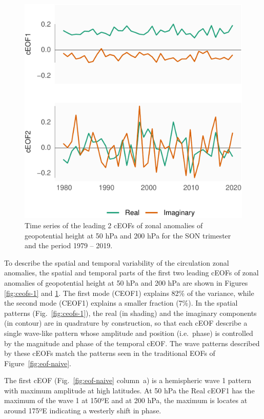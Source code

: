 \documentclass[smallextended]{svjour3}       %
\begin{document}
\begin{figure}
\centering
\includegraphics{../figures/ceofs-2-1.pdf}
\caption{\label{fig:ceofs-2}Time series of the leading 2 cEOFs of zonal anomalies of geopotential height at 50 hPa and 200 hPa for the SON trimester and the period 1979 -- 2019.}
\end{figure}

To describe the spatial and temporal variability of the circulation zonal anomalies, the spatial and temporal parts of the first two leading cEOFs of zonal anomalies of geopotential height at 50 hPa and 200 hPa are shown in Figures \ref{fig:ceofs-1} and \ref{fig:ceofs-2}. The first mode (CEOF1) explains 82\% of the variance, while the second mode (CEOF1) explains a smaller fraction (7\%). In the spatial patterns (Fig.~\ref{fig:ceofs-1}), the real (in shading) and the imaginary components (in contour) are in quadrature by construction, so that each cEOF describe a single wave-like pattern whose amplitude and position (i.e.~phase) is controlled by the magnitude and phase of the temporal cEOF. The wave patterns described by these cEOFs match the patterns seen in the traditional EOFs of Figure~\ref{fig:eof-naive}.

The first cEOF (Fig.~\ref{fig:eof-naive} column~a) is a hemispheric wave 1 pattern with maximum amplitude at high latitudes. At 50 hPa the Real cEOF1 has the maximum of the wave 1 at 150ºE and at 200 hPa, the maximum is locates at around 175ºE indicating a westerly shift in phase.
\end{document}
